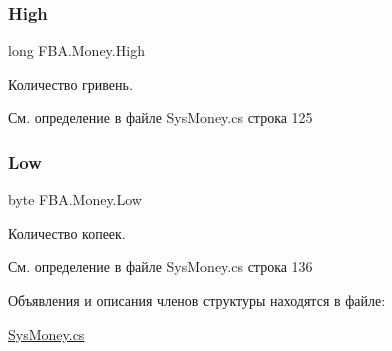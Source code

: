 \subsubsection{\texorpdfstring{High}{High}}
{\footnotesize\ttfamily long F\+B\+A.\+Money.\+High\hspace{0.3cm}{\ttfamily [get]}}



Количество гривень. 



См. определение в файле Sys\+Money.\+cs строка 125

\mbox{\label{struct_f_b_a_1_1_money_a229ada74c4d0ae2a873e56669bfe4f98}} 
\subsubsection{\texorpdfstring{Low}{Low}}
{\footnotesize\ttfamily byte F\+B\+A.\+Money.\+Low\hspace{0.3cm}{\ttfamily [get]}}



Количество копеек. 



См. определение в файле Sys\+Money.\+cs строка 136



Объявления и описания членов структуры находятся в файле\+:\begin{DoxyCompactItemize}
\item 
\mbox{\hyperlink{_sys_money_8cs}{Sys\+Money.\+cs}}\end{DoxyCompactItemize}
